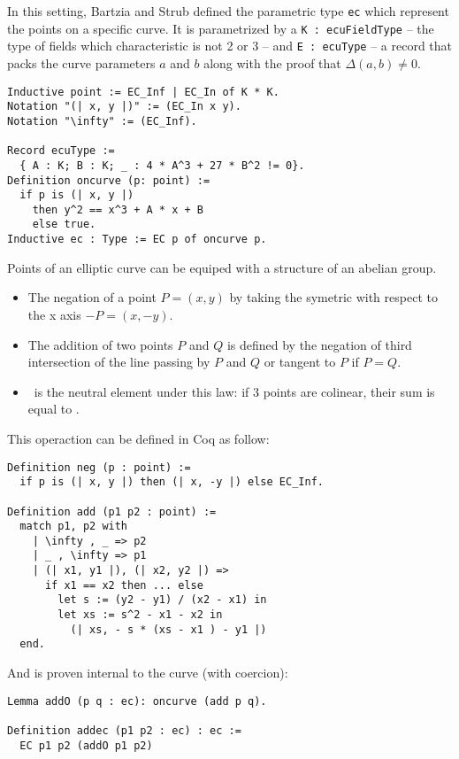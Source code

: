 In this setting, Bartzia and Strub defined the parametric type \texttt{ec} which
represent the points on a specific curve. It is parametrized by
a \texttt{K : ecuFieldType} -- the type of fields which characteristic is not 2 or 3 --
and \texttt{E : ecuType} -- a record that packs the curve parameters $a$ and $b$
along with the proof that $\Delta(a,b) \neq 0$.
\begin{lstlisting}[language=Coq]
Inductive point := EC_Inf | EC_In of K * K.
Notation "(| x, y |)" := (EC_In x y).
Notation "\infty" := (EC_Inf).

Record ecuType :=
  { A : K; B : K; _ : 4 * A^3 + 27 * B^2 != 0}.
Definition oncurve (p: point) :=
  if p is (| x, y |)
    then y^2 == x^3 + A * x + B
    else true.
Inductive ec : Type := EC p of oncurve p.
\end{lstlisting}

Points of an elliptic curve can be equiped with a structure of an abelian group.
\begin{itemize}
  \item The negation of a point $P = (x,y)$ by taking the symetric with respect to the x axis $-P = (x, -y)$.
  \item The addition of two points $P$ and $Q$ is defined by the negation of third intersection
  of the line passing by $P$ and $Q$ or tangent to $P$ if $P = Q$.
  \item \Oinf\ is the neutral element under this law: if 3 points are colinear, their sum is equal to \Oinf.
\end{itemize}

This operaction can be defined in Coq as follow:
\begin{lstlisting}[language=Coq]
Definition neg (p : point) :=
  if p is (| x, y |) then (| x, -y |) else EC_Inf.

Definition add (p1 p2 : point) :=
  match p1, p2 with
    | \infty , _ => p2
    | _ , \infty => p1
    | (| x1, y1 |), (| x2, y2 |) =>
      if x1 == x2 then ... else
        let s := (y2 - y1) / (x2 - x1) in
        let xs := s^2 - x1 - x2 in
          (| xs, - s * (xs - x1 ) - y1 |)
  end.
\end{lstlisting}

And is proven internal to the curve (with coercion):
\begin{lstlisting}[language=Coq]
Lemma addO (p q : ec): oncurve (add p q).

Definition addec (p1 p2 : ec) : ec :=
  EC p1 p2 (addO p1 p2)
\end{lstlisting}


